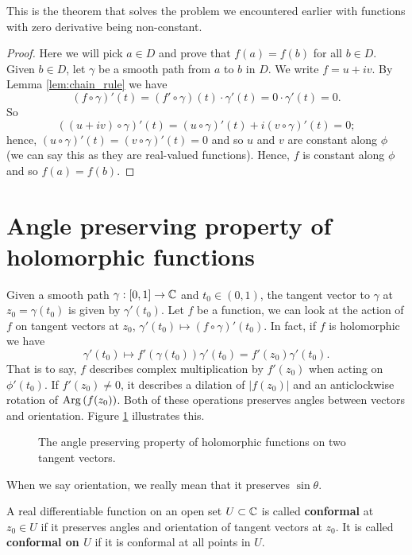 This is the theorem that solves the problem we encountered earlier with functions with zero derivative being non-constant.

\begin{proof}
    Here we will pick $a \in D$ and prove that $f(a) = f(b)$ for all $b \in D$. Given $b \in D$, let $\gamma$ be a smooth path from $a$ to $b$ in $D$. We write $f = u + iv$. By Lemma \ref{lem:chain_rule} we have 
    \[ (f \circ \gamma)'(t) = (f' \circ \gamma)(t) \cdot \gamma'(t) = 0 \cdot \gamma'(t) = 0. \]
    So
    \[ ((u + iv) \circ \gamma)'(t) = (u \circ \gamma)'(t) + i(v \circ \gamma)'(t) = 0; \]
    hence, $(u \circ \gamma)'(t) = (v \circ \gamma)'(t) = 0$ and so $u$ and $v$ are constant along $\phi$ (we can say this as they are real-valued functions). Hence, $f$ is constant along $\phi$ and so $f(a) = f(b)$.
\end{proof}

\section{Angle preserving property of holomorphic functions}

Given a smooth path $\gamma: [0, 1] \to \mathbb{C}$ and $t_0 \in (0, 1)$, the tangent vector to $\gamma$ at $z_0 = \gamma(t_0)$ is given by $\gamma'(t_0)$. Let $f$ be a function, we can look at the action of $f$ on tangent vectors at $z_0$, $\gamma'(t_0) \mapsto (f \circ \gamma)'(t_0)$. In fact, if $f$ is holomorphic we have
\[ \gamma'(t_0) \mapsto f'(\gamma(t_0))\gamma'(t_0) = f'(z_0)\gamma'(t_0). \]
That is to say, $f$ describes complex multiplication by $f'(z_0)$ when acting on $\phi'(t_0)$. If $f'(z_0) \neq 0$, it describes a dilation of $\lvert f(z_0) \rvert$ and an anticlockwise rotation of $\operatorname{Arg}{(f(z_0))}$. Both of these operations preserves angles between vectors and orientation. Figure \ref{fig:holomorphic-function} illustrates this.

\begin{figure}
    \centering
    \caption{The angle preserving property of holomorphic functions on two tangent vectors.}
    \label{fig:holomorphic-function}
\end{figure}

\begin{remark}
    When we say orientation, we really mean that it preserves $\sin{\theta}$.
\end{remark}

\begin{definition}[Conformal]
    A real differentiable function on an open set $U \subset \mathbb{C}$ is called \textbf{conformal} at $z_0 \in U$ if it preserves angles and orientation of tangent vectors at $z_0$. It is called \textbf{conformal on $U$} if it is conformal at all points in $U$.
\end{definition}

